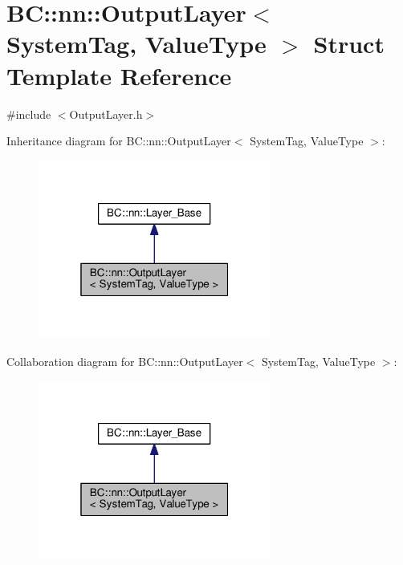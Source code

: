 \hypertarget{structBC_1_1nn_1_1OutputLayer}{}\section{BC\+:\+:nn\+:\+:Output\+Layer$<$ System\+Tag, Value\+Type $>$ Struct Template Reference}
\label{structBC_1_1nn_1_1OutputLayer}


{\ttfamily \#include $<$Output\+Layer.\+h$>$}



Inheritance diagram for BC\+:\+:nn\+:\+:Output\+Layer$<$ System\+Tag, Value\+Type $>$\+:
\nopagebreak
\begin{figure}[H]
\begin{center}
\leavevmode
\includegraphics[width=217pt]{structBC_1_1nn_1_1OutputLayer__inherit__graph}
\end{center}
\end{figure}


Collaboration diagram for BC\+:\+:nn\+:\+:Output\+Layer$<$ System\+Tag, Value\+Type $>$\+:
\nopagebreak
\begin{figure}[H]
\begin{center}
\leavevmode
\includegraphics[width=217pt]{structBC_1_1nn_1_1OutputLayer__coll__graph}
\end{center}
\end{figure}
